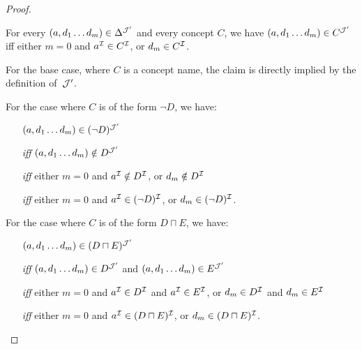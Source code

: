 \begin{proof}
    \begin{claim}\label{claim:forest-model-concepts}
        For every $(a,d_1\dots d_m)\in\Delta^{\mathcal{J}'}$ and every concept $C$, we
        have $(a,d_1\dots d_m)\in C^{\mathcal{J}'}$ iff either $m=0$ and $a^\mathcal{I}\in
        C^\mathcal{I}$, or $d_m\in C^\mathcal{I}$.
    \end{claim}

    \noindent
    For the base case, where $C$ is a concept name, the claim is directly
    implied by the definition of~$\mathcal{J}'$.

    For the case where $C$ is of the form $\lnot D$, we have:
    \begin{itemize}
        \item[]
            $(a,d_1\dots d_m)\in(\lnot D)^{\mathcal{J}'}$
        \item[\emph{iff}]
            $(a,d_1\dots d_m)\notin D^{\mathcal{J}'}$
        \item[\emph{iff}]
            either $m=0$ and $a^\mathcal{I}\notin D^\mathcal{I}$, or $d_m\notin D^\mathcal{I}$
        \item[\emph{iff}]
            either $m=0$ and $a^\mathcal{I}\in(\lnot D)^\mathcal{I}$, or $d_m\in(\lnot D)^\mathcal{I}$.
    \end{itemize}

    \noindent
    For the case where $C$ is of the form $D\sqcap E$, we have:
    \begin{itemize}
        \item[]
            $(a,d_1\dots d_m)\in(D\sqcap E)^{\mathcal{J}'}$
        \item[\emph{iff}]
            $(a,d_1\dots d_m)\in D^{\mathcal{J}'}$ and $(a,d_1\dots d_m)\in E^{\mathcal{J}'}$
        \item[\emph{iff}]
            either $m=0$ and $a^\mathcal{I}\in D^\mathcal{I}$ and $a^\mathcal{I}\in E^\mathcal{I}$, or
            $d_m\in D^\mathcal{I}$ and $d_m\in E^\mathcal{I}$
        \item[\emph{iff}]
            either $m=0$ and $a^\mathcal{I}\in(D\sqcap E)^\mathcal{I}$, or
            $d_m\in(D\sqcap E)^\mathcal{I}$.
    \end{itemize}


\end{proof}
